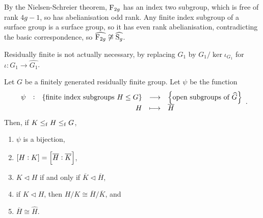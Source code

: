 By the Nielsen-Schreier theorem, $ \mathrm{F}_{2g} $ has an index two subgroup, which is free of rank $ 4g - 1 $, so has abelianisation odd rank. Any finite index subgroup of a surface group is a surface group, so it has even rank abelianisation, contradicting the basic correspondence, so $ \widehat{\mathrm{F}_{2g}} \not\cong \widehat{\mathrm{S}_g} $.


\begin{remark}
Residually finite is not actually necessary, by replacing $ G_1 $ by $ G_1 / \ker \iota_{G_1} $ for $ \iota : G_1 \to \widehat{G_1} $.
\end{remark}

\begin{proposition}
Let $ G $ be a finitely generated residually finite group. Let $ \psi $ be the function
$$ \function[\psi]{\cbr{\text{finite index subgroups} \ H \le G}}{\cbr{\text{open subgroups of} \ \widehat{G}}}{H}{\overline{H}}. $$
Then, if $ K \le_{\mathrm{f}} H \le_{\mathrm{f}} G $,
\begin{enumerate}
\item $ \psi $ is a bijection,
\item $ \sbr{H : K} = \sbr{\overline{H} : \overline{K}} $,
\item $ K \triangleleft H $ if and only if $ \overline{K} \triangleleft \overline{H} $,
\item if $ K \triangleleft H $, then $ H / K \cong \overline{H} / \overline{K} $, and
\item $ \overline{H} \cong \widehat{H} $.
\end{enumerate}
\end{proposition}

